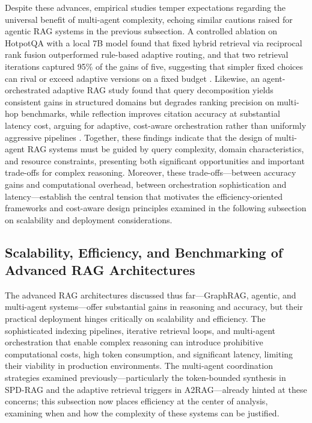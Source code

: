 \documentclass[11pt]{article}
\begin{document}
Despite these advances, empirical studies temper expectations regarding the universal benefit of multi-agent complexity, echoing similar cautions raised for agentic RAG systems in the previous subsection. A controlled ablation on HotpotQA with a local 7B model found that fixed hybrid retrieval via reciprocal rank fusion outperformed rule-based adaptive routing, and that two retrieval iterations captured 95\% of the gains of five, suggesting that simpler fixed choices can rival or exceed adaptive versions on a fixed budget \cite{ref305}. Likewise, an agent-orchestrated adaptive RAG study found that query decomposition yields consistent gains in structured domains but degrades ranking precision on multi-hop benchmarks, while reflection improves citation accuracy at substantial latency cost, arguing for adaptive, cost-aware orchestration rather than uniformly aggressive pipelines \cite{ref31}. Together, these findings indicate that the design of multi-agent RAG systems must be guided by query complexity, domain characteristics, and resource constraints, presenting both significant opportunities and important trade-offs for complex reasoning. Moreover, these trade-offs---between accuracy gains and computational overhead, between orchestration sophistication and latency---establish the central tension that motivates the efficiency-oriented frameworks and cost-aware design principles examined in the following subsection on scalability and deployment considerations.

\subsection{Scalability, Efficiency, and Benchmarking of Advanced RAG Architectures}

The advanced RAG architectures discussed thus far---GraphRAG, agentic, and multi-agent systems---offer substantial gains in reasoning and accuracy, but their practical deployment hinges critically on scalability and efficiency. The sophisticated indexing pipelines, iterative retrieval loops, and multi-agent orchestration that enable complex reasoning can introduce prohibitive computational costs, high token consumption, and significant latency, limiting their viability in production environments. The multi-agent coordination strategies examined previously---particularly the token-bounded synthesis in SPD-RAG and the adaptive retrieval triggers in A2RAG---already hinted at these concerns; this subsection now places efficiency at the center of analysis, examining when and how the complexity of these systems can be justified.
\end{document}
